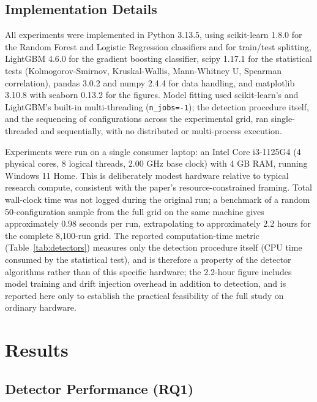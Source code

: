 \documentclass[conference]{IEEEtran}
\begin{document}
\subsection{Implementation Details}

All experiments were implemented in Python 3.13.5, using scikit-learn 1.8.0 for the Random Forest and Logistic Regression classifiers and for train/test splitting, LightGBM 4.6.0 for the gradient boosting classifier, scipy 1.17.1 for the statistical tests (Kolmogorov-Smirnov, Kruskal-Wallis, Mann-Whitney U, Spearman correlation), pandas 3.0.2 and numpy 2.4.4 for data handling, and matplotlib 3.10.8 with seaborn 0.13.2 for the figures. Model fitting used scikit-learn's and LightGBM's built-in multi-threading (\texttt{n\_jobs=-1}); the detection procedure itself, and the sequencing of configurations across the experimental grid, ran single-threaded and sequentially, with no distributed or multi-process execution.

Experiments were run on a single consumer laptop: an Intel Core i3-1125G4 (4 physical cores, 8 logical threads, 2.00 GHz base clock) with 4 GB RAM, running Windows 11 Home. This is deliberately modest hardware relative to typical research compute, consistent with the paper's resource-constrained framing. Total wall-clock time was not logged during the original run; a benchmark of a random 50-configuration sample from the full grid on the same machine gives approximately 0.98 seconds per run, extrapolating to approximately 2.2 hours for the complete 8,100-run grid. The reported computation-time metric (Table~\ref{tab:detectors}) measures only the detection procedure itself (CPU time consumed by the statistical test), and is therefore a property of the detector algorithms rather than of this specific hardware; the 2.2-hour figure includes model training and drift injection overhead in addition to detection, and is reported here only to establish the practical feasibility of the full study on ordinary hardware.

\section{Results}

\subsection{Detector Performance (RQ1)}
\end{document}
